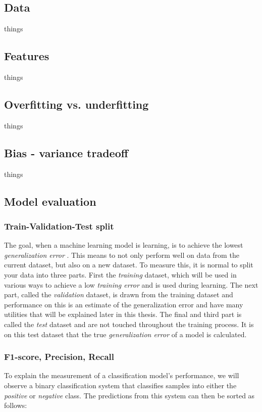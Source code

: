     \subsection{Data}
        things
    \subsection{Features}
        things
    \subsection{Overfitting vs. underfitting}
        things
    \subsection{Bias - variance tradeoff}
        things
        
    \subsection{Model evaluation}
    \subsubsection{Train-Validation-Test split}
        The goal, when a machine learning model is learning, is to achieve the lowest \textit{generalization error} \cite{Goodfellow-et-al-2016_generalization}. This means to not only perform well on data from the current dataset, but also on a new dataset. To measure this, it is normal to split your data into three parts\cite{Goodfellow-et-al-2016_train_val_test_split}. First the \textit{training} dataset, which will be used in various ways to achieve a low \textit{training error} and is used during learning. The next part, called the \textit{validation} dataset, is drawn from the training dataset and performance on this is an estimate of the generalization error and have many utilities that will be explained later in this thesis. The final and third part is called the \textit{test} dataset and are not touched throughout the training process. It is on this test dataset that the true \textit{generalization error} of a model is calculated. 
    \subsubsection{F1-score, Precision, Recall} \label{f1_score}
        To explain the measurement of a classification model's performance, we will observe a binary classification system that classifies samples into either the \textit{positive} or \textit{negative} class\cite{powers2020evaluation_f1_recall_precision}. The predictions from this system can then be sorted as follows:
        
